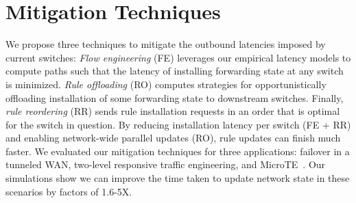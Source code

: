 \section{Mitigation Techniques}

We propose three techniques to mitigate the outbound latencies
imposed by current switches:
{\em Flow engineering} (FE) leverages our empirical latency models to compute
paths such that the latency of installing forwarding state at any
switch is minimized.
{\em Rule
  offloading} (RO) computes strategies for opportunistically
offloading installation of some forwarding state to downstream switches.
Finally, {\em rule reordering} (RR) sends rule installation
requests in an order that is optimal for the switch in question. By reducing
installation latency per switch (FE + RR) and enabling network-wide parallel
updates (RO),
rule updates can finish much faster. 
We evaluated our mitigation techniques for three applications: failover in a tunneled WAN, two-level
responsive traffic engineering, and MicroTE~\cite{microte}. Our
simulations show we can improve
the time taken to update network state in these scenarios by factors
of 1.6-5X.

